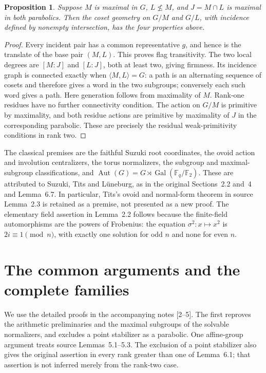 \documentclass[11pt]{article}
\newtheorem{proposition}[theorem]{Proposition}
\newcommand{\Aut}{\operatorname{Aut}}
\newcommand{\F}{\mathbb F}
\begin{document}
\begin{proposition}
Suppose $M$ is maximal in $G$, $L\nleq M$, and $J=M\cap L$ is maximal
in both parabolics. Then the coset geometry on $G/M$ and $G/L$, with
incidence defined by nonempty intersection, has the four properties above.
\end{proposition}
\begin{proof}
Every incident pair has a common representative $g$, and hence is the
translate of the base pair $(M,L)$. This proves flag transitivity.
The two local degrees are $[M:J]$ and $[L:J]$, both at least two, giving
firmness. Its incidence graph is connected exactly when
$\langle M,L\rangle=G$: a path is an alternating sequence of cosets
and therefore gives a word in the two subgroups; conversely each such
word gives a path. Here generation follows from maximality of $M$.
Rank-one residues have no further connectivity condition. The action
on $G/M$ is primitive by maximality, and both residue actions are
primitive by maximality of $J$ in the corresponding parabolic. These
are precisely the residual weak-primitivity conditions in rank two.
\end{proof}

The classical premises are the faithful Suzuki root coordinates, the
ovoid action and involution centralizers, the torus normalizers, the
subgroup and maximal-subgroup classifications, and
$\Aut(G)=G\rtimes\operatorname{Gal}(\F_q/\F_2)$. These are attributed to
Suzuki, Tits and L\"uneburg, as in the original Sections~2.2 and~4 and
Lemma~6.7. In particular, Tits's ovoid and normal-form theorem in source
Lemma~2.3 is retained as a premise, not presented as a new proof.
The elementary field assertion in Lemma~2.2 follows because the
finite-field automorphisms are the powers of Frobenius: the equation
$\sigma^2:x\mapsto x^2$ is $2i\equiv1\pmod n$, with exactly one solution
for odd $n$ and none for even $n$.

\section{The common arguments and the complete families}
We use the detailed proofs in the accompanying notes [2--5]. The first
reproves the arithmetic preliminaries and the maximal subgroups of the
solvable normalizers, and excludes a point stabilizer as a parabolic.
One affine-group argument treats source Lemmas~5.1--5.3. The exclusion of
a point stabilizer also gives the original assertion in every rank greater than one of
Lemma~6.1; that assertion is not inferred merely from the rank-two case.
\end{document}
